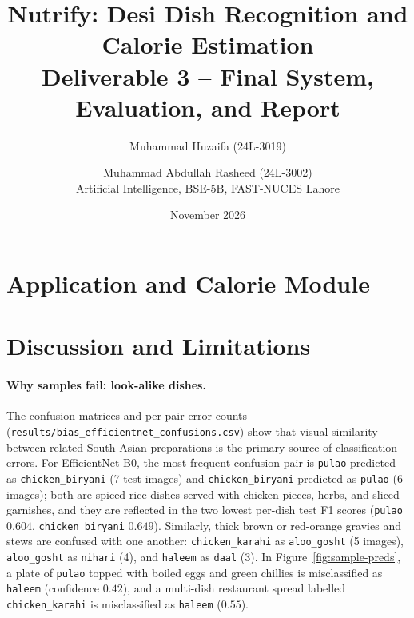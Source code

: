 \documentclass[11pt,a4paper]{article}
\title{Nutrify: Desi Dish Recognition and Calorie Estimation\\
\large Deliverable 3 -- Final System, Evaluation, and Report}
\author{Muhammad Huzaifa (24L-3019) \and Muhammad Abdullah Rasheed (24L-3002)\\
Artificial Intelligence, BSE-5B, FAST-NUCES Lahore}
\date{November 2026}
\begin{document}
\maketitle

\begin{abstract}

\end{abstract}






\section{Application and Calorie Module}


\section{Discussion and Limitations}

\paragraph{Why samples fail: look-alike dishes.}
The confusion matrices and per-pair error counts
(\texttt{results/bias\_efficientnet\_confusions.csv}) show that visual
similarity between related South Asian preparations is the primary source of
classification errors. For EfficientNet-B0, the most frequent confusion pair is
\texttt{pulao} predicted as \texttt{chicken\_biryani} (7 test images) and
\texttt{chicken\_biryani} predicted as \texttt{pulao} (6 images); both are
spiced rice dishes served with chicken pieces, herbs, and sliced garnishes, and
they are reflected in the two lowest per-dish test F1 scores (\texttt{pulao}
$0.604$, \texttt{chicken\_biryani} $0.649$). Similarly, thick brown or
red-orange gravies and stews are confused with one another:
\texttt{chicken\_karahi} as \texttt{aloo\_gosht} (5 images),
\texttt{aloo\_gosht} as \texttt{nihari} (4), and \texttt{haleem} as
\texttt{daal} (3). In Figure~\ref{fig:sample-preds}, a plate of
\texttt{pulao} topped with boiled eggs and green chillies is misclassified as
\texttt{haleem} (confidence $0.42$), and a multi-dish restaurant spread
labelled \texttt{chicken\_karahi} is misclassified as \texttt{haleem} ($0.55$).
\end{document}

